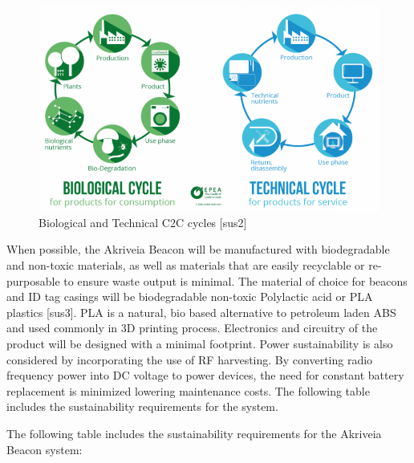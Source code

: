 \begin{figure}[H]
\centering
    \includegraphics[scale=0.85]{./images/BioTechCycle.png}
    \caption{Biological and Technical C2C cycles [sus2]}
\end{figure}

When possible, the Akriveia Beacon will be manufactured with biodegradable and non-toxic materials, as well as materials that are easily recyclable or re-purposable to ensure waste output is minimal. The material of choice for beacons and ID tag casings will be biodegradable non-toxic Polylactic acid or PLA plastics [sus3]. PLA is a natural, bio based alternative to petroleum laden ABS and used commonly in 3D printing process. Electronics and circuitry of the product will be designed with a minimal footprint. Power sustainability is also considered by incorporating the use of RF harvesting. By converting radio frequency power into DC voltage to power devices, the need for constant battery replacement is minimized lowering maintenance costs. The following table includes the sustainability requirements for the system.

\break
The following table includes the sustainability requirements for the Akriveia Beacon system:

